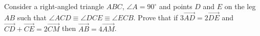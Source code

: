 Consider a right-angled triangle $ABC$, $\angle A = 90^{\circ}$ and points $D$ and $E$ on the leg $AB$ such that $\angle ACD \equiv \angle DCE \equiv \angle ECB$. Prove that if $3\overrightarrow{AD} = 2\overrightarrow{DE}$ and $\overrightarrow{CD} + \overrightarrow{CE} = 2\overrightarrow{CM}$ then $\overrightarrow{AB} = 4\overrightarrow{AM}$.